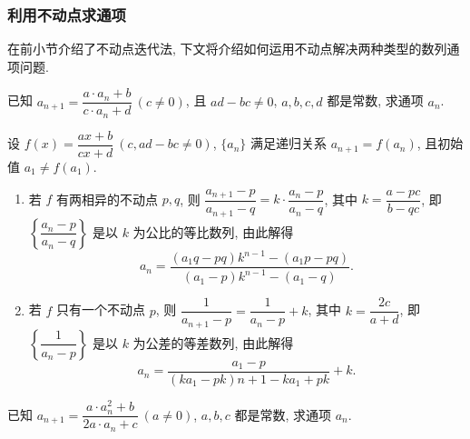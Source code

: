\subsubsection{利用不动点求通项}

在前小节介绍了不动点迭代法, 下文将介绍如何运用不动点解决两种类型的数列通项问题.

\begin{example}
    已知 $a_{n+1}=\dfrac{a\cdot a_n+b}{c\cdot a_n+d}~  (c\not=0)$, 且 $ad-bc\not=0$, $a,b,c,d$ 都是常数, 求通项 $a_n$.
\end{example}
\begin{solution}
    设 $f(x)=\dfrac{ax+b}{cx+d}~  (c,ad-bc\not=0)$, $\{a_n\}$ 满足递归关系 $a_{n+1}=f(a_n)$, 且初始值 $a_1\not=f(a_1)$.
    \begin{enumerate}[label=(\arabic{*})]
        \item 若 $f$ 有两相异的不动点 $p,q$, 则 $\dfrac{a_{n+1}-p}{a_{n+1}-q}=k\cdot \dfrac{a_{n}-p}{a_{n}-q}$, 其中 $k=\dfrac{a-pc}{b-qc}$, 即
              $\left\{\dfrac{a_n-p}{a_n-q}\right\}$ 是以 $k$ 为公比的等比数列, 由此解得
              $$a_{n}=\dfrac{\left( a_1q-pq\right) k^{n-1}-\left( a_1p-pq\right) }{\left( a_1-p\right) k^{n-1}-\left( a_1-q\right) }.$$
        \item 若 $f$ 只有一个不动点 $p$, 则 $\dfrac{1}{a_{n+1}-p}=\dfrac{1}{a_{n}-p}+k$, 其中 $k=\dfrac{2c}{a+d}$, 
              即 $\left\{\dfrac{1}{a_n-p}\right\}$ 是以 $k$ 为公差的等差数列, 由此解得
              $$a_{n}=\dfrac{a_{1}-p}{\left( ka_{1}-pk\right) n+1-ka_{1}+pk}+k.$$
    \end{enumerate}
\end{solution}
\begin{example}
    已知 $a_{n+1}=\dfrac{a\cdot a_n^2+b}{2a \cdot a_n+c}~  (a\not=0)$, $a,b,c$ 都是常数, 求通项 $a_n$.
\end{example}
